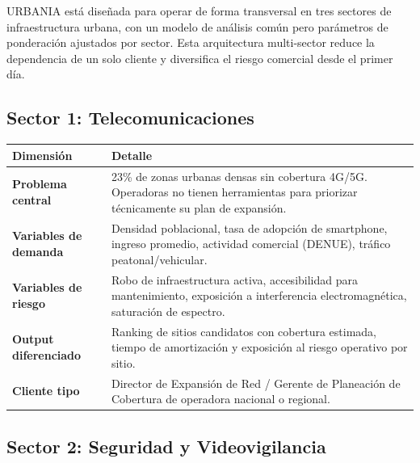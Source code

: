 \documentclass[12pt,a4paper]{article}
\begin{document}
URBANIA está diseñada para operar de forma transversal en tres sectores de infraestructura urbana, con un modelo de análisis común pero parámetros de ponderación ajustados por sector. Esta arquitectura multi-sector reduce la dependencia de un solo cliente y diversifica el riesgo comercial desde el primer día.

\subsection{Sector 1: Telecomunicaciones}

\begin{table}[H]
\centering
\small
\renewcommand{\arraystretch}{1.3}
\begin{tabularx}{\textwidth}{>{\bfseries}l X}
\toprule
\rowcolor{grisoscuro}
\color{white}\textbf{Dimensión} & \color{white}\textbf{Detalle} \\
\midrule
Problema central & 23\% de zonas urbanas densas sin cobertura 4G/5G. Operadoras no tienen herramientas para priorizar técnicamente su plan de expansión. \\
\rowcolor{fondofila}
Variables de demanda & Densidad poblacional, tasa de adopción de smartphone, ingreso promedio, actividad comercial (DENUE), tráfico peatonal/vehicular. \\
Variables de riesgo & Robo de infraestructura activa, accesibilidad para mantenimiento, exposición a interferencia electromagnética, saturación de espectro. \\
\rowcolor{fondofila}
Output diferenciado & Ranking de sitios candidatos con cobertura estimada, tiempo de amortización y exposición al riesgo operativo por sitio. \\
Cliente tipo & Director de Expansión de Red / Gerente de Planeación de Cobertura de operadora nacional o regional. \\
\bottomrule
\end{tabularx}
\end{table}

\subsection{Sector 2: Seguridad y Videovigilancia}
\end{document}
